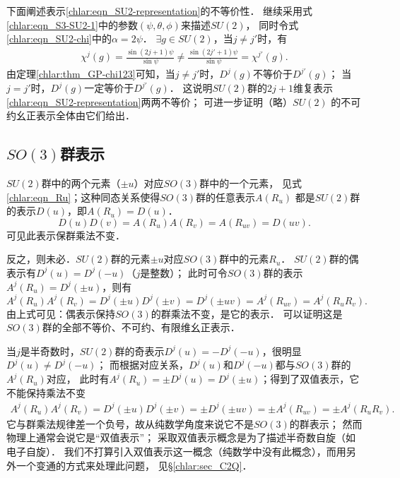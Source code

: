 下面阐述表示\eqref{chlar:eqn_SU2-representation}的不等价性．
继续采用式\eqref{chlar:eqn_S3-SU2-1}中的参数$(\psi,\theta,\phi)$来描述$SU(2)$，
同时令式\eqref{chlar:eqn_SU2-chi}中的$\alpha=2\psi$．
$\exists g \in SU(2)$，当$j\neq j'$时，有
\begin{align*}
	\chi^j(g)= \frac{\sin(2j+1)\psi}{\sin \psi}
	\neq \frac{\sin(2j'+1)\psi}{\sin \psi} = \chi^{j'}(g).
\end{align*}
由定理\ref{chlar:thm_GP-chi123}可知，当$j\neq j'$时，$D^j(g)$不等价于$D^{j'}(g)$；
当$j= j'$时，$D^j(g)$一定等价于$D^{j'}(g)$．
这说明$SU(2)$群的$2j+1$维复表示\eqref{chlar:eqn_SU2-representation}两两不等价；
可进一步证明（略）$SU(2)$ 的不可约幺正表示全体由它们给出．






\subsection{$SO(3)$群表示}
$SU(2)$群中的两个元素（$\pm u$）对应$SO(3)$群中的一个元素，
见式\eqref{chlar:eqn_Ru}；这种同态关系使得$SO(3)$群的任意表示$A(R_u)$
都是$SU(2)$群的表示$D(u)$，即$A(R_u)=D(u)$．
\begin{equation}
    D(u)D(v)=A(R_u) A(R_v) = A(R_{uv}) = D(uv) .
\end{equation}
可见此表示保群乘法不变．

反之，则未必．$SU(2)$群的元素$\pm u$对应$SO(3)$群中的元素$R_u$．
$SU(2)$群的偶表示有$D^j(u)=D^j(-u)$（$j$是整数）；
此时可令$SO(3)$群的表示$A^j(R_u)= D^j(\pm u)$，则有
\begin{equation*}
    A^j(R_u) A^j(R_v) =D^j(\pm u)D^j(\pm v)=D^j(\pm uv) = A^j(R_{uv}) =A^j(R_{u}R_{v}) .
\end{equation*}
由上式可见：偶表示保持$SO(3)$的群乘法不变，是它的表示．
可以证明\cite[\S 6.6.4]{qiuws-2011}这是$SO(3)$群的全部不等价、不可约、有限维幺正表示．

当$j$是半奇数时，$SU(2)$群的奇表示$D^j(u)=-D^j(-u)$，很明显$D^j(u)\neq D^j(-u)$；
而根据对应关系，$D^j(u)$和$ D^j(-u)$都与$SO(3)$群的$A^j(R_u)$对应，
此时有$A^j(R_u)=\pm D^j(u)=D^j(\pm u)$；得到了{\kaishu 双值表示}，它不能保持乘法不变
\begin{align*}
    A^j(R_u) A^j(R_v) =D^j(\pm u)D^j(\pm v)=\pm D^j(\pm uv) = \pm  A^j(R_{uv})=\pm A^j(R_{u}R_{v}) .
\end{align*}
它与群乘法规律差一个负号，故从纯数学角度来说它不是$SO(3)$的群表示；
然而物理上通常会说它是“双值表示”；
采取双值表示概念是为了描述半奇数自旋（如电子自旋）．
我们不打算引入双值表示这一概念（纯数学中没有此概念），而用另外一个变通的方式来处理此问题，
见\S\ref{chlar:sec_C2Q}．



